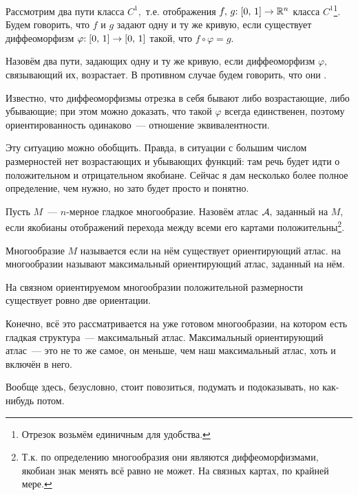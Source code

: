 \documentclass{notes}
\begin{document}
	\begin{de}
		Рассмотрим два пути класса $C^1,$ т.е. отображения $f, \, g \text{\text{:}} \; [0, \, 1] \to \mathbb{R}^n$ класса $C^1$\footnote{Отрезок возьмём единичным для удобства.}. Будем говорить, что $f$ и $g$ задают одну и ту же кривую, если существует диффеоморфизм $\varphi\text{\text{:}} \; [0, \, 1] \to [0, \, 1]$ такой, что $f \circ \varphi = g$. 
	\end{de}

	\begin{de}
		Назовём два пути, задающих одну и ту же кривую,  если диффеоморфизм $\varphi,$ связывающий их, возрастает. В противном случае будем говорить, что они .
	\end{de}

	\begin{rem}
		Известно, что диффеоморфизмы отрезка в себя бывают либо возрастающие, либо убывающие; при этом можно доказать, что такой $\varphi$ всегда единственен, поэтому ориентированность одинаково~--- отношение эквивалентности.
	\end{rem}

	Эту ситуацию можно обобщить. Правда, в ситуации с большим числом размерностей нет возрастающих и убывающих функций: там речь будет идти о положительном и отрицательном якобиане. Сейчас я дам несколько более полное определение, чем нужно, но зато будет просто и понятно.

	\begin{de}
		Пусть $M$~--- $n$-мерное гладкое многообразие. Назовём атлас $\mathcal{A},$ заданный на $M,$  если якобианы отображений перехода между всеми его картами положительны\footnote{Т.к. по определению многообразия они являются диффеоморфизмами, якобиан знак менять всё равно не может. На связных картах, по крайней мере.}.
	\end{de}

	\begin{de}
		Многообразие $M$ называется  если на нём существует ориентирующий атлас.  на многообразии называют максимальный ориентирующий атлас, заданный на нём.
	\end{de}

	\begin{st}
		На связном ориентируемом многообразии положительной размерности существует ровно две ориентации.
	\end{st}

	\begin{rem}
		Конечно, всё это рассматривается на уже готовом многообразии, на котором есть гладкая структура~--- максимальный атлас. Максимальный ориентирующий атлас~--- это не то же самое, он меньше, чем наш максимальный атлас, хоть и включён в него.

		Вообще здесь, безусловно, стоит повозиться, подумать и подоказывать, но как-нибудь потом.
	\end{rem}
\end{document}
